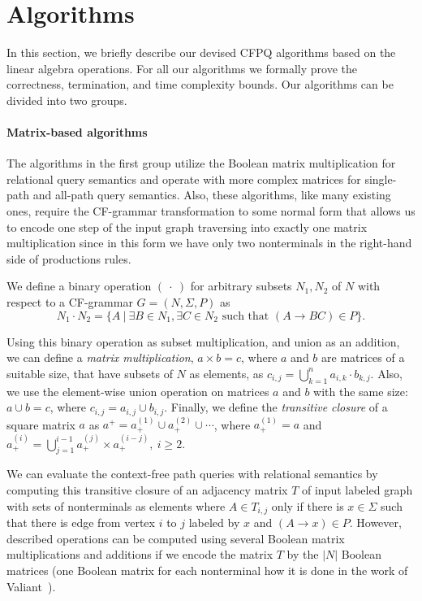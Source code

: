 \documentclass[sigconf, nonacm]{acmart}
\begin{document}
\section{Algorithms}
 In this section, we briefly describe our devised CFPQ algorithms based on the linear algebra operations. For all our algorithms we formally prove the correctness, termination, and time complexity bounds. Our algorithms can be divided into two groups.
 
 \paragraph{Matrix-based algorithms}
 The algorithms in the first group utilize the Boolean matrix multiplication for relational query semantics and operate with more complex matrices for single-path and all-path query semantics. Also, these algorithms, like many existing ones, require the CF-grammar transformation to some normal form that allows us to encode one step of the input graph traversing into exactly one matrix multiplication since in this form we have only two nonterminals in the right-hand side of productions rules.
 
We define a binary operation $(~\cdot~)$ for arbitrary subsets \mbox{$N_1, N_2$} of $N$ with respect to a CF-grammar \mbox{$G = (N, \Sigma, P)$} as
$$N_1 \cdot N_2 = \{A~|~\exists B \in N_1, \exists C \in N_2 \text{ such that }(A \rightarrow B C) \in P\}.$$

Using this binary operation as subset multiplication, and union as an addition, we can define a \emph{matrix multiplication}, \mbox{$a \times b = c$}, where $a$ and $b$ are matrices of a suitable size, that have subsets of $N$ as elements, as $c_{i,j} = \bigcup^{n}_{k=1}{a_{i,k} \cdot b_{k,j}}$. Also, we use the element-wise union operation on matrices $a$ and $b$ with the same size: \mbox{$a \cup b = c$}, where $c_{i,j} = a_{i,j} \cup b_{i,j}.$ Finally, we define the \emph{transitive closure} of a square matrix $a$ as \mbox{$a^+ = a^{(1)}_+ \cup a^{(2)}_+ \cup \cdots$}, where \mbox{$a^{(1)}_+ = a$} and $a^{(i)}_+ = \bigcup^{i-1}_{j=1}{a^{(j)}_+ \times a^{(i-j)}_+}, ~i \ge 2$.

We can evaluate the context-free path queries with relational semantics by computing this transitive closure of an adjacency matrix $T$ of input labeled graph with sets of nonterminals as elements where $A \in T_{i,j}$ only if there is $x \in \Sigma$ such that there is edge from vertex $i$ to $j$ labeled by $x$ and $(A \rightarrow x) \in P$. However, described operations can be computed using several Boolean matrix multiplications and additions if we encode the matrix $T$ by the $|N|$ Boolean matrices (one Boolean matrix for each nonterminal 
how it is done in the work of Valiant~\cite{valiant}).
\end{document}
